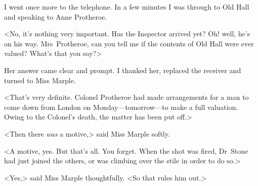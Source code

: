 I went once more to the telephone. In a few minutes I was through to Old Hall and speaking to Anne Protheroe.

<No, it's nothing very important. Has the Inspector arrived yet? Oh! well, he's on his way. Mrs~Protheroe, can you tell me if the contents of Old Hall were ever valued? What's that you say?>

Her answer came clear and prompt. I thanked her, replaced the receiver and turned to Miss Marple.

<That's very definite. Colonel Protheroe had made arrangements for a man to come down from London on Monday—tomorrow—to make a full valuation. Owing to the Colonel's death, the matter has been put off.>

<Then there \emph{was} a motive,> said Miss Marple softly.

<A motive, yes. But that's all. You forget. When the shot was fired, Dr~Stone had just joined the others, or was climbing over the stile in order to do so.>

<Yes,> said Miss Marple thoughtfully. <So that rules him out.>